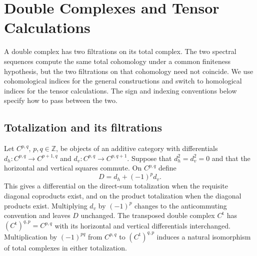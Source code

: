 \chapter{Double Complexes and Tensor Calculations}
\label{ch:double-complexes}

A double complex has two filtrations on its total complex. The two spectral
sequences compute the same total cohomology under a common finiteness
hypothesis, but the two filtrations on that cohomology need not coincide.
We use cohomological indices for the general constructions and switch to
homological indices for the tensor calculations. The sign and indexing
conventions below specify how to pass between the two.

\section{Totalization and its filtrations}

\begin{proposition}
\label{res:B01}
Let \(C^{p,q}\), \(p,q\in\mathbb Z\), be objects of an additive category
with differentials \(d_h\colon C^{p,q}\to C^{p+1,q}\) and
\(d_v\colon C^{p,q}\to C^{p,q+1}\). Suppose that
\(d_h^2=d_v^2=0\) and that the horizontal and vertical squares commute.
On \(C^{p,q}\) define
\[
    D=d_h+(-1)^p d_v .
\]
This gives a differential on the direct-sum totalization when the requisite
diagonal coproducts exist, and on the product totalization when the
diagonal products exist. Multiplying \(d_v\) by \((-1)^p\) changes to the
anticommuting convention and leaves \(D\) unchanged. The transposed double
complex \(C^{\mathrm t}\) has \((C^{\mathrm t})^{q,p}=C^{p,q}\) with its
horizontal and vertical differentials interchanged. Multiplication by
\((-1)^{pq}\) from \(C^{p,q}\) to \((C^{\mathrm t})^{q,p}\) induces a
natural isomorphism of total complexes in either totalization.
\end{proposition}

